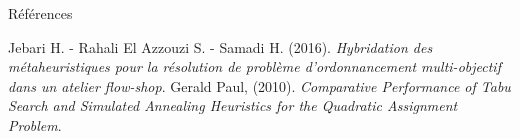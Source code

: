 \documentclass{beamer}
\begin{document}
\begin{frame}{Références}
    \begin{thebibliography}{9}
         Jebari H. - Rahali El Azzouzi S. - Samadi H. (2016). \textit{Hybridation des métaheuristiques pour la résolution de problème d’ordonnancement multi-objectif dans un atelier flow-shop}.
         Gerald Paul, (2010). \textit{Comparative Performance of Tabu Search and Simulated Annealing Heuristics for the Quadratic Assignment Problem}.
    \end{thebibliography}
\end{frame}
\end{document}
